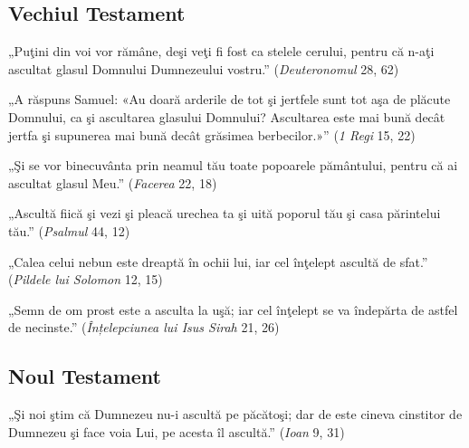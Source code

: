 \subsection{Vechiul Testament}

\begin{displayquote}
    „Puţini din voi vor rămâne, deşi veţi fi fost ca stelele cerului, pentru că n-aţi ascultat glasul Domnului Dumnezeului vostru.”
    (\textit{Deuteronomul} 28, 62)
\end{displayquote}

\begin{displayquote}
    „A răspuns Samuel: «Au doară arderile de tot şi jertfele sunt tot aşa de plăcute Domnului, ca şi ascultarea glasului Domnului? Ascultarea este mai bună decât jertfa şi supunerea mai bună decât grăsimea berbecilor.»”
    (\textit{1 Regi} 15, 22)
\end{displayquote}

\begin{displayquote}
    „Şi se vor binecuvânta prin neamul tău toate popoarele pământului, pentru că ai ascultat glasul Meu.”
    (\textit{Facerea} 22, 18)
\end{displayquote}

\begin{displayquote}
    „Ascultă fiică şi vezi şi pleacă urechea ta şi uită poporul tău şi casa părintelui tău.”
    (\textit{Psalmul} 44, 12)
\end{displayquote}

\begin{displayquote}
    „Calea celui nebun este dreaptă în ochii lui, iar cel înţelept ascultă de sfat.”
    (\textit{Pildele lui Solomon} 12, 15)
\end{displayquote}

\begin{displayquote}
    „Semn de om prost este a asculta la uşă; iar cel înţelept se va îndepărta de astfel de necinste.”
    (\textit{Înțelepciunea lui Isus Sirah} 21, 26)
\end{displayquote}

\subsection{Noul Testament}

\begin{displayquote}
    „Şi noi ştim că Dumnezeu nu-i ascultă pe păcătoşi; dar de este cineva cinstitor de Dumnezeu şi face voia Lui, pe acesta îl ascultă.”
    (\textit{Ioan} 9, 31)
\end{displayquote}